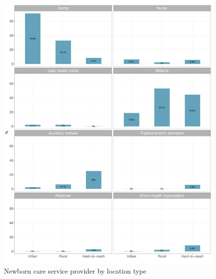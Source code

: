 \documentclass[12pt,a4paper]{article}
\begin{document}
\begin{figure}[H]

{\centering \includegraphics{kayahReport_files/figure-latex/nbc3Plot-1} 

}

\caption{Newborn care service provider by location type}\label{fig:nbc3Plot}
\end{figure}
\end{document}

